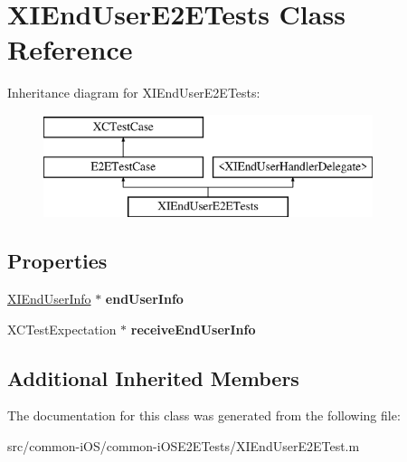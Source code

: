 \hypertarget{interface_x_i_end_user_e2_e_tests}{}\section{X\+I\+End\+User\+E2\+E\+Tests Class Reference}
\label{interface_x_i_end_user_e2_e_tests}
Inheritance diagram for X\+I\+End\+User\+E2\+E\+Tests\+:\begin{figure}[H]
\begin{center}
\leavevmode
\includegraphics[height=3.000000cm]{interface_x_i_end_user_e2_e_tests}
\end{center}
\end{figure}
\subsection*{Properties}
\begin{DoxyCompactItemize}
\item 
\hypertarget{interface_x_i_end_user_e2_e_tests_a02e7e0691e855714877c5e6906fab6e5}{}\label{interface_x_i_end_user_e2_e_tests_a02e7e0691e855714877c5e6906fab6e5} 
\hyperlink{class_x_i_end_user_info}{X\+I\+End\+User\+Info} $\ast$ {\bfseries end\+User\+Info}
\item 
\hypertarget{interface_x_i_end_user_e2_e_tests_ac8657ee39931c88d42a6d0eb041b2910}{}\label{interface_x_i_end_user_e2_e_tests_ac8657ee39931c88d42a6d0eb041b2910} 
X\+C\+Test\+Expectation $\ast$ {\bfseries receive\+End\+User\+Info}
\end{DoxyCompactItemize}
\subsection*{Additional Inherited Members}


The documentation for this class was generated from the following file\+:\begin{DoxyCompactItemize}
\item 
src/common-\/i\+O\+S/common-\/i\+O\+S\+E2\+E\+Tests/X\+I\+End\+User\+E2\+E\+Test.\+m\end{DoxyCompactItemize}
